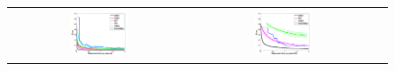 \documentclass{article}
\newcommand{\nnn}{0.33}
\newcommand{\nnh}{0.23}
\begin{document}
\begin{figure}[t!]
\vspace{-0mm}
\begin{center}
\begin{tabular}{ccc}
   \hspace{-5mm} \includegraphics[width=\nnn\textwidth, height=\nnh\textwidth]{plotsx/collisionx/err-vs-time__param4-shaded.pdf} 
& \hspace{-3mm} \includegraphics[width=\nnn\textwidth, height=\nnh\textwidth]{plotsx/collisionx/err-vs-time__param20-shaded.pdf} 

\end{tabular}
\end{center}
\end{figure}
\end{document}
